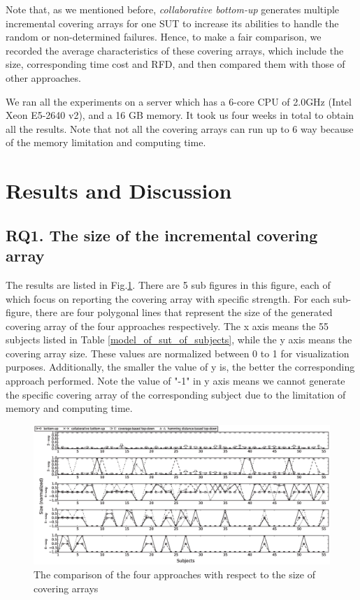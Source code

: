 \documentclass[conference]{IEEEtran}
\theoremstyle{definition}
\begin{document}

Note that, as we mentioned before, \emph{collaborative bottom-up} generates multiple incremental covering arrays for one SUT to increase its abilities to handle the random or non-determined failures. Hence, to make a fair comparison, we recorded the average characteristics of these covering arrays, which include the size, corresponding time cost and RFD, and then compared them with those of other approaches.

We ran all the experiments on a server which has a 6-core CPU of 2.0GHz (Intel Xeon E5-2640 v2), and a 16 GB memory. It took us four weeks in total to obtain all the results. Note that not all the covering arrays can run up to 6 way because of the memory limitation and computing time.

\section{Results and Discussion}

\subsection{RQ1. The size of the incremental covering array}

The results are listed in Fig.\ref{experiement}. There are 5 sub figures in this figure, each of which focus on reporting the covering array with specific strength. For each sub-figure, there are four polygonal lines that represent the size of the generated covering array of the four approaches respectively. The x axis means the 55 subjects listed in Table \ref{model_of_sut_of_subjects}, while the y axis means the covering array size. These values are normalized between 0 to 1 for visualization purposes. Additionally, the smaller the value of y is, the better the corresponding approach performed. Note the value of "-1" in y axis means we cannot generate the specific covering array of the corresponding subject due to the limitation of memory and computing time.

\begin{figure}[htbp]
\center
 \includegraphics[width=7.4in]{size-degree.eps}
\caption{The comparison of the four approaches with respect to the size of covering arrays}
\label{experiement}
\end{figure}
\end{document}
